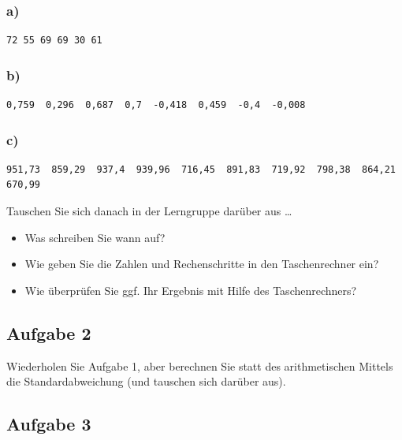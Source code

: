 \documentclass[
  11pt,
  ngerman,
  a4paper,
]{report}
\providecommand{\tightlist}{%
  \setlength{\itemsep}{0pt}\setlength{\parskip}{0pt}}
\begin{document}
\hypertarget{a}{%
\subsubsection{a)}\label{a}}

\begin{verbatim}
72 55 69 69 30 61
\end{verbatim}

\hypertarget{b}{%
\subsubsection{b)}\label{b}}

\begin{verbatim}
0,759  0,296  0,687  0,7  -0,418  0,459  -0,4  -0,008
\end{verbatim}

\hypertarget{c}{%
\subsubsection{c)}\label{c}}

\begin{verbatim}
951,73  859,29  937,4  939,96  716,45  891,83  719,92  798,38  864,21  670,99
\end{verbatim}

Tauschen Sie sich danach in der Lerngruppe darüber aus \ldots{}

\begin{itemize}
\tightlist
\item
  Was schreiben Sie wann auf?
\item
  Wie geben Sie die Zahlen und Rechenschritte in den Taschenrechner ein?
\item
  Wie überprüfen Sie ggf. Ihr Ergebnis mit Hilfe des Taschenrechners?
\end{itemize}

\hypertarget{aufgabe-2-1}{%
\subsection{Aufgabe 2}\label{aufgabe-2-1}}

Wiederholen Sie Aufgabe 1, aber berechnen Sie statt des arithmetischen Mittels die Standardabweichung (und tauschen sich darüber aus).

\hypertarget{aufgabe-3-1}{%
\subsection{Aufgabe 3}\label{aufgabe-3-1}}
\end{document}
